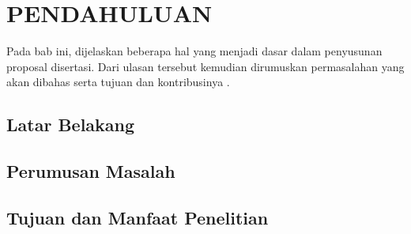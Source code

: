 \chapter{PENDAHULUAN}
Pada bab ini, dijelaskan beberapa hal yang menjadi dasar dalam penyusunan proposal disertasi. Dari ulasan tersebut kemudian dirumuskan permasalahan yang akan dibahas serta tujuan dan kontribusinya \cite{Moody1998}.

\section{Latar Belakang}
\section{Perumusan Masalah}
\section{Tujuan dan Manfaat Penelitian}

